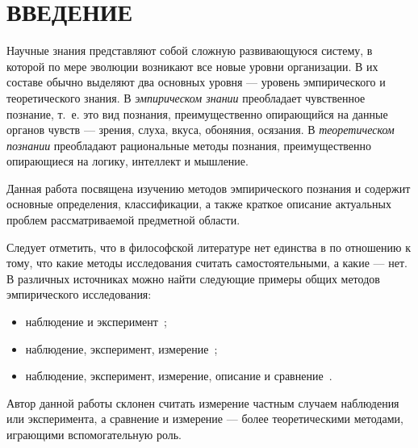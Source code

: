 \section*{ВВЕДЕНИЕ}

Научные знания представляют собой сложную развивающуюся систему, в которой по мере
эволюции возникают все новые уровни организации.
В их составе обычно выделяют два основных уровня --- уровень эмпирического и теоретического знания.
В \emph{эмпирическом знании} преобладает чувственное познание, т.~е. это вид познания,
преимущественно опирающийся на данные органов чувств --- зрения, слуха, вкуса, обоняния, осязания.
В \emph{теоретическом познании} преобладают рациональные методы познания,
преимущественно опирающиеся на логику, интеллект и мышление.

Данная работа посвящена изучению методов эмпирического познания
и содержит основные определения, классификации, а также краткое описание
актуальных проблем рассматриваемой предметной области.

Следует отметить, что в философской литературе нет единства в по отношению к тому,
что какие методы исследования считать самостоятельными, а какие --- нет.
В различных источниках можно найти следующие примеры общих методов эмпирического исследования:
\begin{itemize}
\item наблюдение и эксперимент~\cite{stepin1999};
\item наблюдение, эксперимент, измерение~\cite{moiseev2004};
\item наблюдение, эксперимент, измерение, описание и сравнение~\cite{nekrasov2010, ushakov2008}.
\end{itemize}

Автор данной работы склонен считать измерение частным случаем наблюдения или эксперимента,
а сравнение и измерение --- более теоретическими методами, играющими вспомогательную роль.